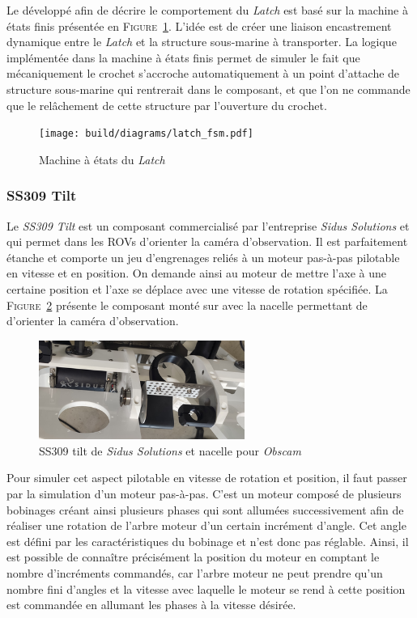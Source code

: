 				Le \plugin{} \gazebo{} développé afin de décrire le comportement du \textit{Latch} est basé sur la machine à états finis présentée en \textsc{Figure}~\ref{fig:latch_fsm}. L'idée est de créer une liaison encastrement dynamique entre le \textit{Latch} et la structure sous-marine à transporter. La logique implémentée dans la machine à états finis permet de simuler le fait que mécaniquement le crochet s'accroche automatiquement à un point d'attache de structure sous-marine qui rentrerait dans le composant, et que l'on ne commande que le relâchement de cette structure par l'ouverture du crochet.

				\begin{figure}[!htb]
					\centering
					\texttt{[image: build/diagrams/latch\_fsm.pdf]}
					\caption{Machine à états du \textit{Latch}}
					\label{fig:latch_fsm}
				\end{figure}
		
			\subsubsection{SS309 Tilt}

				Le \textit{SS309 Tilt} est un composant commercialisé par l'entreprise \textit{Sidus Solutions} et qui permet dans les \gls{ROV}s d'orienter la caméra d'observation. Il est parfaitement étanche et comporte un jeu d'engrenages reliés à un moteur pas-à-pas pilotable en vitesse et en position. On demande ainsi au moteur de mettre l'axe à une certaine position et l'axe se déplace avec une vitesse de rotation spécifiée. La \textsc{Figure}~\ref{fig:ss309_tilt} présente le composant monté sur \argos{} avec la nacelle permettant de d'orienter la caméra d'observation.

				\begin{figure}[!htb]
					\centering
					\includegraphics[width=0.6\textwidth]{imgs/ss309_tilt.png}
					\caption{SS309 tilt de \textit{Sidus Solutions} et nacelle pour \textit{Obscam}}
					\label{fig:ss309_tilt}
				\end{figure}
			
				Pour simuler cet aspect pilotable en vitesse de rotation et position, il faut passer par la simulation d'un moteur pas-à-pas. C'est un moteur composé de plusieurs bobinages créant ainsi plusieurs phases qui sont allumées successivement afin de réaliser une rotation de l'arbre moteur d'un certain incrément d'angle. Cet angle est défini par les caractéristiques du bobinage et n'est donc pas réglable. Ainsi, il est possible de connaître précisément la position du moteur en comptant le nombre d'incréments commandés, car l'arbre moteur ne peut prendre qu'un nombre fini d'angles et la vitesse avec laquelle le moteur se rend à cette position est commandée en allumant les phases à la vitesse désirée.

